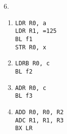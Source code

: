 \documentclass{article}
\begin{document}
\begin{enumerate}
    \pagebreak
    \item[6.]
        \begin{multicols}{2}
        \begin{enumerate}
            \item
                \texttt{LDR R0, a   \\
                LDR R1, =125   \\
                BL f1   \\
                STR R0, x   \\
                }
            \item
                \texttt{LDRB R0, c  \\
                BL f2   \\
                }

            \item
                \texttt{ADR R0, c   \\
                BL f3   \\
                }

            \item
                \texttt{ADD R0, R0, R2  \\
                ADC R1, R1, R3  \\
                BX LR       \\
                }


\end{enumerate}
\end{multicols}
\end{enumerate}
\end{document}
